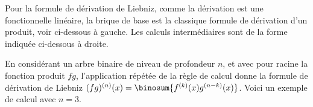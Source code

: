 Pour la formule de dérivation de Liebniz, comme la dérivation est une fonctionnelle linéaire, la brique de base est la classique formule de dérivation d'un produit, voir ci-dessous à gauche. Les calculs intermédiaires sont de la forme indiquée ci-dessous à droite.

%
            {\intertree}{\prodder}


En considérant un arbre binaire de niveau de profondeur $n$, et avec pour racine la fonction produit $f g$, l'application répétée de la règle de calcul donne la formule de dérivation de Liebniz 
$(fg)^{(n)}(x) = \binosum{f^{(k)}(x) g^{(n-k)}(x)}$.
%
Voici un exemple de calcul avec $n=3$.

\binotree{\prodder}



